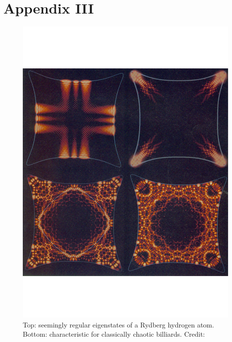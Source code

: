 \section*{Appendix III}
\begin{figure}[H]
\includegraphics[width=\textwidth]{3}
\caption{Top: seemingly regular eigenstates of a Rydberg hydrogen atom. Bottom:  characteristic for classically chaotic billiards. Credit:\cite{gutz}}
\label{fig:3}
\end{figure}
\newpage
%
\printbibliography
%
